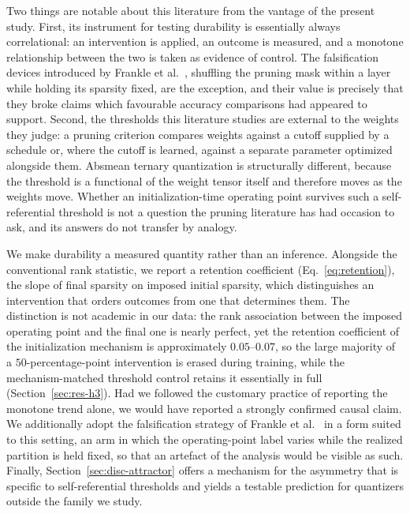 \documentclass[final,5p,times,twocolumn]{elsarticle}
\theoremstyle{remark}
\begin{document}
Two things are notable about this literature from the vantage of the present
study. First, its instrument for testing durability is essentially always
correlational: an intervention is applied, an outcome is measured, and a
monotone relationship between the two is taken as evidence of control. The
falsification devices introduced by Frankle et al.~\cite{frankle2021},
shuffling the pruning mask within a layer while holding its sparsity fixed,
are the exception, and their value is precisely that they broke claims which
favourable accuracy comparisons had appeared to support.
Second, the thresholds this literature studies are external to the weights
they judge: a pruning criterion compares weights against a cutoff supplied by
a schedule or, where the cutoff is learned, against a separate parameter
optimized alongside them. Absmean ternary quantization is structurally
different, because the
threshold is a functional of the weight tensor itself and therefore moves as
the weights move. Whether an initialization-time operating point survives such
a self-referential threshold is not a question the pruning literature has had
occasion to ask, and its answers do not transfer by analogy.

We make durability a measured quantity rather than an inference. Alongside the
conventional rank statistic, we report a retention coefficient
(Eq.~\eqref{eq:retention}), the slope of final sparsity on imposed initial
sparsity, which distinguishes an intervention that orders outcomes from one
that determines them. The distinction is not academic in our data: the rank
association between the imposed operating point and the final one is nearly
perfect, yet the retention coefficient of the initialization mechanism is
approximately $0.05$--$0.07$, so the large majority of a $50$-percentage-point
intervention is erased during training, while the mechanism-matched threshold
control retains it essentially in full (Section~\ref{sec:res-h3}). Had we
followed the customary practice of reporting the monotone trend alone, we would
have reported a strongly confirmed causal claim. We additionally adopt the
falsification strategy of Frankle et al.~\cite{frankle2021} in a form suited to this
setting, an arm in which the operating-point label varies while the
realized partition is held fixed, so that an artefact of the analysis would be
visible as such. Finally, Section~\ref{sec:disc-attractor} offers a mechanism
for the asymmetry that is specific to self-referential thresholds and yields a
testable prediction for quantizers outside the family we study.
\end{document}
